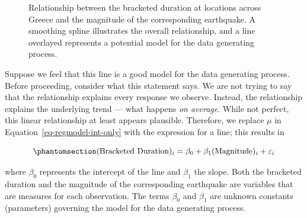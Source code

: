 \documentclass[
  letterpaper,
  DIV=11,
  numbers=noendperiod]{scrreprt}
\theoremstyle{definition}
\theoremstyle{definition}
\theoremstyle{plain}
\theoremstyle{remark}
\begin{document}
\begin{figure}


\caption{\label{fig-regmodel-slr-plot}Relationship between the bracketed
duration at locations across Greece and the magnitude of the
corresponding earthquake. A smoothing spline illustrates the overall
relationship, and a line overlayed represents a potential model for the
data generating process.}

\end{figure}%

Suppose we feel that this line is a good model for the data generating
process. Before proceeding, consider what this statement says. We are
not trying to say that the relationship explains every response we
observe. Instead, the relationship explains the underlying trend ---
what happens \emph{on average}. While not perfect, this linear
relationship at least appears plausible. Therefore, we replace \(\mu\)
in Equation~\ref{eq-regmodel-int-only} with the expression for a line;
this results in

\begin{equation}\phantomsection\label{eq-regmodel-slr}{(\text{Bracketed Duration})_i = \beta_0 + \beta_1 (\text{Magnitude})_i + \varepsilon_i}\end{equation}

where \(\beta_0\) represents the intercept of the line and \(\beta_1\)
the slope. Both the bracketed duration and the magnitude of the
corresponding earthquake are variables that are measures for each
observation. The terms \(\beta_0\) and \(\beta_1\) are unknown constants
(parameters) governing the model for the data generating process.
\end{document}
